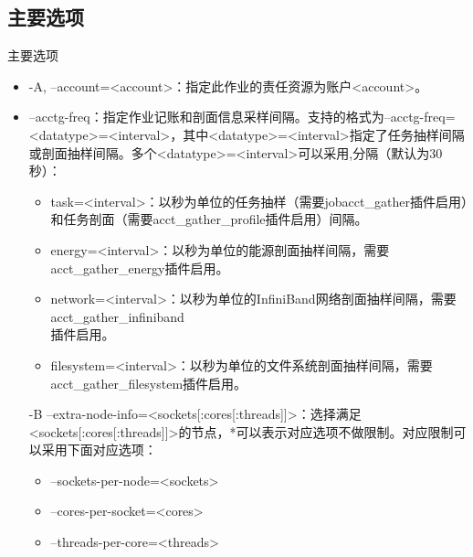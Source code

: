 \subsection{主要选项}
\begin{frame}{主要选项}
\begin{itemize}
	\item -A, --account=<account>：指定此作业的责任资源为账户<account>。
    \item --acctg-freq：指定作业记账和剖面信息采样间隔。支持的格式为--acctg-freq=<datatype>=<interval>，其中<datatype>=<interval>指定了任务抽样间隔或剖面抽样间隔。多个<datatype>=<interval>可以采用,分隔（默认为30秒）：
\begin{itemize}
	\item task=<interval>：以秒为单位的任务抽样（需要jobacct\_gather插件启用）和任务剖面（需要acct\_gather\_profile插件启用）间隔。
    \item energy=<interval>：以秒为单位的能源剖面抽样间隔，需要acct\_gather\_energy插件启用。
    \item network=<interval>：以秒为单位的InfiniBand网络剖面抽样间隔，需要acct\_gather\_infiniband\\插件启用。
    \item filesystem=<interval>：以秒为单位的文件系统剖面抽样间隔，需要acct\_gather\_filesystem插件启用。
\end{itemize}
       -B --extra-node-info=<sockets[:cores[:threads]]>：选择满足<sockets[:cores[:threads]]>的节点，*可以表示对应选项不做限制。对应限制可以采用下面对应选项：
\begin{itemize}
	\item --sockets-per-node=<sockets>
    \item --cores-per-socket=<cores>
    \item --threads-per-core=<threads>
\end{itemize}


\end{itemize}
\end{frame}
